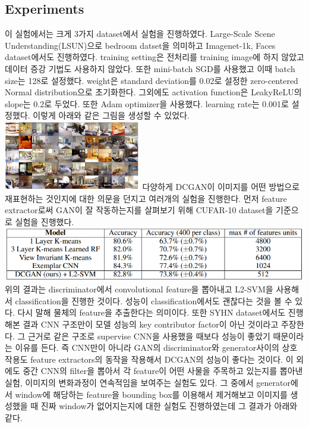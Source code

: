 \documentclass[extendedabs]{bmvc2k}
\begin{document}
 \subsection{Experiments}
 \quad 이 실험에서는 크게 3가지 dataset에서 실험을 진행하였다. Large-Scale Scene Understanding(LSUN)으로 bedroom datset을 의미하고
 Imagenet-1k, Faces dataset에서도 진행하였다. training setting은 전처리를 training image에 하지 않았고 데이터 증강 기법도 사용하지 않았다. 또한 
 mini-batch SGD를 사용했고 이때 batch size는 128로 설정했다. weight은 standard deviation를 0.02로 설정한 zero-centered Normal distribution으로 초기화한다.
 그외에도 activation function은 LeakyReLU의 slope는 0.2로 두었다. 또한 Adam optimizer을 사용했다. learning rate는 0.001로 설정했다. 이렇게 아래와 같은 그림을 생성할 수 있었다.
 \newline  \includegraphics[width=6cm]{images/01_DCGAN.PNG}
 \newline 다양하게 DCGAN이 이미지를 어떤 방법으로 재표현하는 것인지에 대한 의문을 던지고 여러개의 실험을 진행한다. 먼저 feature extractor로써 GAN이 잘 작동하는지를 살펴보기 위해
 CUFAR-10 dataset을 기준으로 실험을 진행했다.
 \newline  \includegraphics[width=\linewidth]{images/02_DCGAN.PNG}
 위의 결과는 discriminator에서 convolutional feature을 뽑아내고 L2-SVM을 사용해서 classification을 진행한 것이다. 성능이 classification에서도 괜찮다는 것을 볼 수 있다.
 다시 말해 물체의 feature을 추출한다는 의미이다. 또한 SYHN dataset에서도 진행해본 결과 CNN 구조만이 모델 성능의 key contributor factor이 아닌 것이라고 주장한다.
 그 근거로  같은 구조로 supervise CNN을 사용했을 때보다 성능이 좋았기 때문이라는 이유를 든다. 즉 CNN만이 아니라 GAN의 discriminator와 generator사이의 상호작용도 feature extractors의 동작을 작용해서 DCGAN의 성능이 좋다는 것이다.
 이 외에도 중간 CNN의 filter을 뽑아서 각 feature이 어떤 사물을 주목하고 있는지를 뽑아낸 실험, 이미지의 변화과정이 연속적임을 보여주는 실험도 있다.
 그 중에서 generator에서 window에 해당하는 feature을 bounding box를 이용해서 제거해보고 이미지를 생성했을 때 진짜 window가 없어지는지에 대한 실험도 진행하였는데 그 결과가 아래와 같다.
\end{document}
